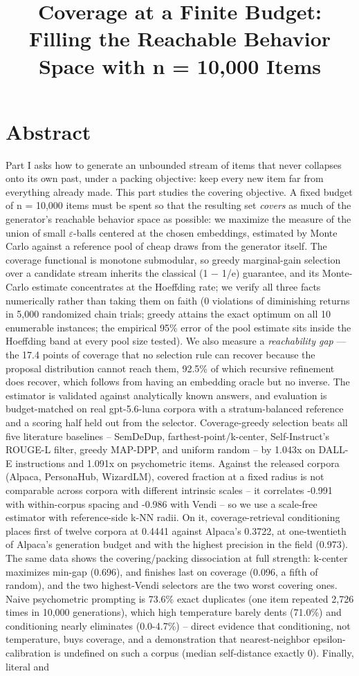 \documentclass[11pt]{article}
\title{Coverage at a Finite Budget: Filling the Reachable Behavior Space with n = 10,000 Items}
\author{}
\date{}
\theoremstyle{plain}
\theoremstyle{definition}
\begin{document}
\maketitle
\section{Abstract}
Part I asks how to generate an unbounded stream of items that never collapses onto its own past, under a packing objective: keep every new item far from everything already made. This part studies the covering objective. A fixed budget of n = 10,000 items must be spent so that the resulting set \emph{covers} as much of the generator's reachable behavior space as possible: we maximize the measure of the union of small $\varepsilon$-balls centered at the chosen embeddings, estimated by Monte Carlo against a reference pool of cheap draws from the generator itself. The coverage functional is monotone submodular, so greedy marginal-gain selection over a candidate stream inherits the classical (1 $-$ 1/e) guarantee, and its Monte-Carlo estimate concentrates at the Hoeffding rate; we verify all three facts numerically rather than taking them on faith (0 violations of diminishing returns in 5,000 randomized chain trials; greedy attains the exact optimum on all 10 enumerable instances; the empirical 95\% error of the pool estimate sits inside the Hoeffding band at every pool size tested). We also measure a \emph{reachability gap} --- the 17.4 points of coverage that no selection rule can recover because the proposal distribution cannot reach them, 92.5\% of which recursive refinement does recover, which follows from having an embedding oracle but no inverse. The estimator is validated against analytically known answers, and evaluation is budget-matched on real gpt-5.6-luna corpora with a stratum-balanced reference and a scoring half held out from the selector. Coverage-greedy selection beats all five literature baselines -- SemDeDup, farthest-point/k-center, Self-Instruct's ROUGE-L filter, greedy MAP-DPP, and uniform random -- by 1.043x on DALL-E instructions and 1.091x on psychometric items. Against the released corpora (Alpaca, PersonaHub, WizardLM), covered fraction at a fixed radius is not comparable across corpora with different intrinsic scales -- it correlates -0.991 with within-corpus spacing and -0.986 with Vendi -- so we use a scale-free estimator with reference-side k-NN radii. On it, coverage-retrieval conditioning places first of twelve corpora at 0.4441 against Alpaca's 0.3722, at one-twentieth of Alpaca's generation budget and with the highest precision in the field (0.973). The same data shows the covering/packing dissociation at full strength: k-center maximizes min-gap (0.696), and finishes last on coverage (0.096, a fifth of random), and the two highest-Vendi selectors are the two worst covering ones. Naive psychometric prompting is 73.6\% exact duplicates (one item repeated 2,726 times in 10,000 generations), which high temperature barely dents (71.0\%) and conditioning nearly eliminates (0.0-4.7\%) -- direct evidence that conditioning, not temperature, buys coverage, and a demonstration that nearest-neighbor epsilon-calibration is undefined on such a corpus (median self-distance exactly 0). Finally, literal and 
\end{document}
